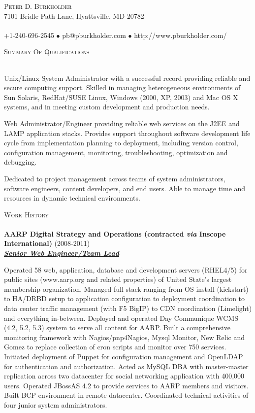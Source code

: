 \documentclass{article}
\newcommand{\lineunder}{\vspace*{-8pt} \\ \hspace*{-18pt} \hrulefill \\}
\newcommand{\header}[1]{{\hspace*{-15pt}\vspace*{6pt} \textsc{#1}} \vspace*{-6pt} \lineunder}
\newcommand{\employer}[3]{{ \textbf{#1} (#2)\\ \underline{\textbf{\emph{#3}}}\\  }}
\newcommand{\contact}[3]{
    \vspace*{-8pt}
    \begin{center}
        {\LARGE \scshape {#1}}\\
        #2 \lineunder 
        #3
    \end{center}
    \vspace*{-8pt}
}
\newenvironment{achievements}{\begin{list}{\topsep 0pt \itemsep -2pt}} {\vspace*{4pt}\end{list}}
\begin{document}
\small
\smallskip
\vspace*{-44pt}

\contact{Peter D. Burkholder}
{7101 Bridle Path Lane, Hyattsville, MD 20782}
{+1-240-696-2545 $\bullet$ pb@pburkholder.com  $\bullet$ http://www.pburkholder.com/}

\header{Summary Of Qualifications}
\begin{achievements}
    \item Unix/Linux System Administrator with a successful record providing reliable and secure computing support.  Skilled in managing heterogeneous environments of Sun Solaris, RedHat/SUSE Linux, Windows (2000, XP, 2003) and Mac OS X systems, and in meeting custom development and production needs.
    \item Web Administrator/Engineer providing reliable web services on the J2EE and LAMP application stacks.  Provides support throughout software development life cycle from implementation planning to deployment, including version control, configuration management, monitoring, troubleshooting, optimization and debugging.
    \item Dedicated to project management across teams of system administrators, software engineers, content developers, and end users.  Able to manage time and resources in dynamic technical environments.
\end{achievements}

\header{Work History}
\employer{AARP Digital Strategy and Operations (contracted \emph{via} Inscope International)}{2008-2011}{Senior Web Engineer/Team Lead}
\begin{achievements}
  \item Operated 58 web, application, database and development servers (RHEL4/5) for public sites (www.aarp.org and related properties) of United State's largest membership organization.  Managed full stack ranging from OS install (kickstart) to HA/DRBD setup to application configuration to deployment coordination to data center traffic management (with F5 BigIP) to CDN coordination (Limelight) and everything in-between.  Deployed and operated Day Communique WCMS (4.2, 5.2, 5.3) system to serve all content for AARP.  Built a comprehensive monitoring framework with Nagios/pnp4Nagios, Mysql Monitor, New Relic and Gomez to replace collection of cron scripts and monitor over 750 services.  Initiated deployment of Puppet for configuration management and OpenLDAP for authentication and authorization.  Acted as MySQL DBA with master-master replication across two datacenter for social networking application with 400,000 users.  Operated JBossAS 4.2 to provide services to AARP members and visitors.  Built BCP environment in remote datacenter. Coordinated technical activities of four junior system administrators.
\end{achievements}
\end{document}
